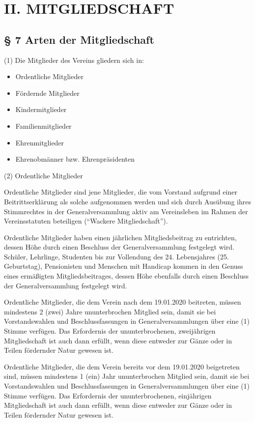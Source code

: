 \documentclass[11pt,a4paper]{article}
\begin{document}
\section{II. MITGLIEDSCHAFT}

\subsection{§ 7
Arten der Mitgliedschaft}

(1)
Die Mitglieder des Vereins gliedern sich in:

\begin{itemize}
\item
Ordentliche Mitglieder
\item
Fördernde Mitglieder
\item
Kindermitglieder
\item
Familienmitglieder
\item
Ehrenmitglieder
\item
Ehrenobmänner bzw. Ehrenpräsidenten
\end{itemize}

(2)
Ordentliche Mitglieder

Ordentliche Mitglieder sind jene Mitglieder, die vom Vorstand aufgrund einer Beitrittserklärung als solche aufgenommen werden und sich durch Ausübung ihres Stimmrechtes in der Generalversammlung aktiv am Vereinsleben im Rahmen der Vereinsstatuten beteiligen ("`Wackere Mitgliedschaft"').

Ordentliche Mitglieder haben einen jährlichen Mitgliedsbeitrag zu entrichten, dessen Höhe durch einen Beschluss der Generalversammlung festgelegt wird.
Schüler, Lehrlinge, Studenten bis zur Vollendung des 24. Lebensjahres (25. Geburtstag), Pensionisten und Menschen mit Handicap kommen in den Genuss eines ermäßigten Mitgliedsbeitrages, dessen Höhe ebenfalls durch einen Beschluss der Generalversammlung festgelegt wird.

Ordentliche Mitglieder, die dem Verein nach dem 19.01.2020 beitreten, müssen mindestens 2 (zwei) Jahre ununterbrochen Mitglied sein, damit sie bei Vorstandswahlen und Beschlussfassungen in Generalversammlungen über eine (1) Stimme verfügen.
Das Erfordernis der ununterbrochenen, zweijährigen Mitgliedschaft ist auch dann erfüllt, wenn diese entweder zur Gänze oder in Teilen fördernder Natur gewesen ist.

Ordentliche Mitglieder, die dem Verein bereits vor dem 19.01.2020 beigetreten sind, müssen mindestens 1 (ein) Jahr ununterbrochen Mitglied sein, damit sie bei Vorstandswahlen und Beschlussfassungen in Generalversammlungen über eine (1) Stimme verfügen.
Das Erfordernis der ununterbrochenen, einjährigen Mitgliedschaft ist auch dann erfüllt, wenn diese entweder zur Gänze oder in Teilen fördernder Natur gewesen ist.
\end{document}
